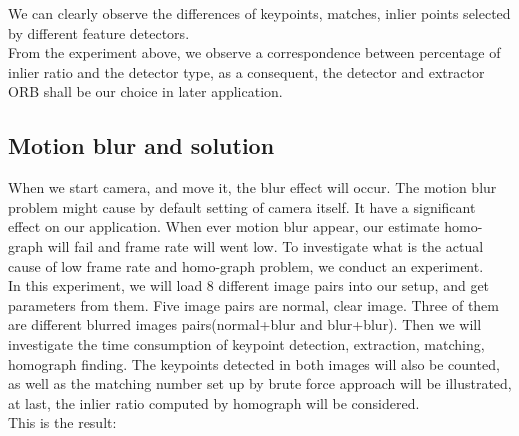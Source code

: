 \documentclass[10pt,conference,compsocconf]{IEEEtran}
\begin{document}
We can clearly observe the differences of keypoints, matches, inlier points selected by different feature detectors.\\

From the experiment above, we observe a correspondence between percentage of inlier ratio and the detector type, as a consequent, the detector and extractor ORB shall be our choice in later application.\\

\subsection{Motion blur and solution}

When we start camera, and move it, the blur effect will occur. The motion blur problem might cause by default setting of camera itself. It have a significant effect on our application. When ever motion blur appear, our estimate homo-graph will fail and frame rate will went low. To investigate what is the actual cause of low frame rate and homo-graph problem, we conduct an experiment.\\

In this experiment, we will load 8 different image pairs into our setup, and get parameters from them.
Five image pairs are normal, clear image. Three of them are different blurred images pairs(normal+blur and blur+blur). Then we will investigate the time consumption of keypoint detection, extraction, matching, homograph finding. The keypoints detected in both images will also be counted, as well as the matching number set up by brute force approach will be illustrated, at last, the inlier ratio computed by homograph will be considered.\\

This is the result:\\
\end{document}

